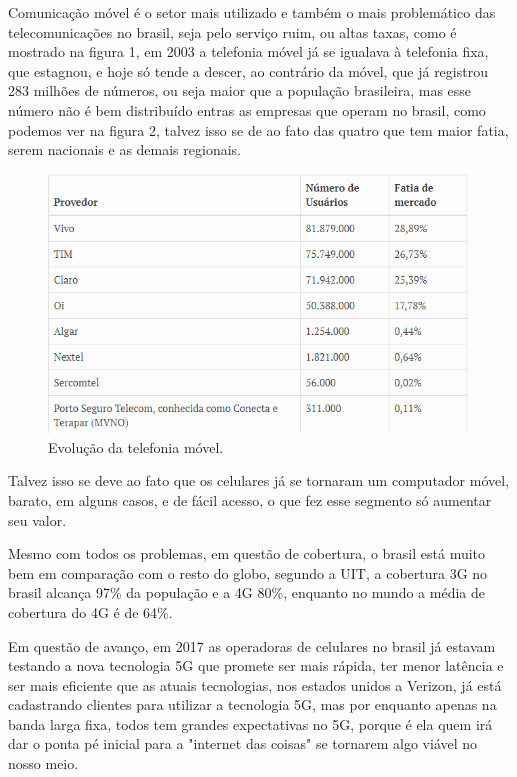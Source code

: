\documentclass{sbrt2018port}
\begin{document}
Comunicação móvel é o setor mais utilizado e também o mais problemático das telecomunicações no brasil, seja pelo serviço ruim, ou altas taxas, como é mostrado na figura 1, em 2003 a telefonia móvel já se igualava à telefonia fixa, que estagnou, e hoje só tende a descer, ao contrário da móvel, que já registrou 283 milhões de números, ou seja maior que a população brasileira, mas esse número não é bem distribuído entras as empresas que operam no brasil, como podemos ver na figura 2, talvez isso se de ao fato das quatro que tem maior fatia, serem nacionais e as demais regionais.

\begin{figure}[!ht]%
    \centering
    \includegraphics[width=\linewidth]{fatiamercado.png}
    \caption{Evolução da telefonia móvel.}
    \label{f_cerd2}
\end{figure}

Talvez isso se deve ao fato que os celulares já se tornaram um computador móvel, barato, em alguns casos, e de fácil acesso, o que fez esse segmento só aumentar seu valor.

Mesmo com todos os problemas, em questão de cobertura, o brasil está muito bem em comparação com o resto do globo, segundo a UIT, a cobertura 3G no brasil alcança 97\% da população e a 4G 80\%, enquanto no mundo a média de cobertura do 4G é de 64\%.

Em questão de avanço, em 2017 as operadoras de celulares no brasil já estavam testando a nova tecnologia 5G que promete ser mais rápida, ter menor latência e ser mais eficiente que as atuais tecnologias, nos estados unidos a Verizon, já está cadastrando clientes para utilizar a tecnologia 5G, mas por enquanto apenas na banda larga fixa, todos tem grandes expectativas no 5G, porque é ela quem irá dar o ponta pé inicial para a "internet das coisas" se tornarem algo viável no nosso meio.
\end{document}

